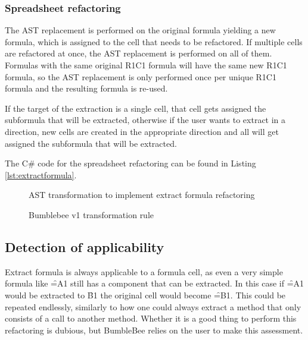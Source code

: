 \subsubsection{Spreadsheet refactoring}

The AST replacement is performed on the original formula yielding a new formula, which is assigned to the cell that needs to be refactored.
If multiple cells are refactored at once, the AST replacement is performed on all of them.
Formulas with the same original R1C1 formula will have the same new R1C1 formula, so the AST replacement is only performed once per unique R1C1 formula and the resulting formula is re-used.

If the target of the extraction is a single cell, that cell gets assigned the subformula that will be extracted, otherwise if the user wants to extract in a direction, new cells are created in the appropriate direction and all will get assigned the subformula that will be extracted.

The C\# code for the spreadsheet refactoring can be found in Listing \ref{lst:extractformula}.

\begin{figure}
	\centering
	
	\caption{AST transformation to implement extract formula refactoring}
	\label{fig:extractformulaASTtransformations}
\end{figure}

\begin{figure}
	\centering
	
	\caption{Bumblebee v1 transformation rule}
	\label{fig:bbv1transformationrule}
\end{figure}

\newpage

\subsection{Detection of applicability}

Extract formula is always applicable to a formula cell, as even a very simple formula like \f{=A1} still has a component that can be extracted.
In this case if \f{=A1} would be extracted to \f{B1} the original cell would become \f{=B1}.
This could be repeated endlessly, similarly to how one could always extract a method that only consists of a call to another method.
Whether it is a good thing to perform this refactoring is dubious, but BumbleBee relies on the user to make this assessment.

